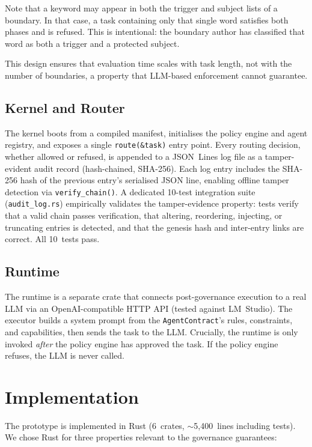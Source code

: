 \documentclass[11pt,a4paper]{article}
\begin{document}
Note that a keyword may appear in both the trigger and subject lists of a
boundary. In that case, a task containing only that single word satisfies
both phases and is refused. This is intentional: the boundary author has
classified that word as both a trigger and a protected subject.

This design ensures that evaluation time scales with task length, not with
the number of boundaries, a property that LLM-based enforcement cannot
guarantee.

\subsection{Kernel and Router}

The kernel boots from a compiled manifest, initialises the policy engine
and agent registry, and exposes a single \texttt{route(\&task)} entry point.
Every routing decision, whether allowed or refused, is appended to a
JSON~Lines log file as a tamper-evident audit record (hash-chained,
SHA-256). Each log entry includes the SHA-256 hash of the previous
entry's serialised JSON line, enabling offline tamper detection via
\texttt{verify\_chain()}.
A dedicated 10-test integration suite (\texttt{audit\_log.rs}) empirically
validates the tamper-evidence property: tests verify that a valid chain
passes verification, that altering, reordering, injecting, or truncating
entries is detected, and that the genesis hash and inter-entry links are
correct. All 10~tests pass.

\subsection{Runtime}

The runtime is a separate crate that connects post-governance execution
to a real LLM via an OpenAI-compatible HTTP API (tested against LM~Studio).
The executor builds a system prompt from the \texttt{AgentContract}'s
rules, constraints, and capabilities, then sends the task to the LLM.
Crucially, the runtime is only invoked \emph{after} the policy engine has
approved the task. If the policy engine refuses, the LLM is never called.

\section{Implementation}
\label{sec:impl}

The prototype is implemented in Rust (6~crates, $\sim$5{,}400~lines
including tests). We chose Rust for three properties relevant to the
governance guarantees:
\end{document}
